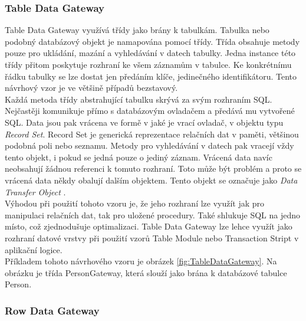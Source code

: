 \documentclass[ing,male,java,dept456]{diploma}						%
\begin{document}
\subsubsection{Table Data Gateway}

Table Data Gateway využívá třídy jako brány k tabulkám. Tabulka nebo podobný databázový objekt je namapována pomocí třídy. Třída obsahuje metody pouze pro ukládání, mazání a vyhledávání v datech tabulky. Jedna instance této třídy přitom poskytuje rozhraní ke všem záznamům v tabulce.  Ke konkrétnímu řádku tabulky se lze dostat jen předáním klíče, jedinečného identifikátoru. Tento návrhový vzor je ve většině případů bezstavový. \\
Každá metoda třídy abstrahující tabulku skrývá za svým rozhraním SQL. Nejčastěji komunikuje přímo s databázovým ovladačem a předává mu vytvořené SQL. Data jsou pak vrácena ve formě v jaké je vrací ovladač, v objektu typu \textit{Record Set}. Record Set je generická reprezentace relačních dat v paměti, většinou podobná poli nebo seznamu. Metody pro vyhledávání v datech pak vracejí vždy tento objekt, i pokud se jedná pouze o jediný záznam. Vrácená data navíc neobsahují žádnou referenci k tomuto rozhraní. Toto může být problém a proto se vrácená data někdy obalují dalším objektem. Tento objekt se označuje jako \textit{Data Transfer Object} \cite{fowler}. \\
Výhodou při použití tohoto vzoru je, že jeho rozhraní lze využít jak pro manipulaci relačních dat, tak pro uložené procedury. Také shlukuje SQL na jedno místo, což zjednodušuje optimalizaci. Table Data Gateway lze lehce využít jako rozhraní datové vrstvy při použití vzorů Table Module nebo Transaction Stript v aplikační logice. \\
Příkladem tohoto návrhového vzoru je obrázek \ref{fig:TableDataGateway}. Na obrázku je třída PersonGateway, která slouží jako brána k databázové tabulce Person.


\subsubsection{Row Data Gateway}
\end{document}
